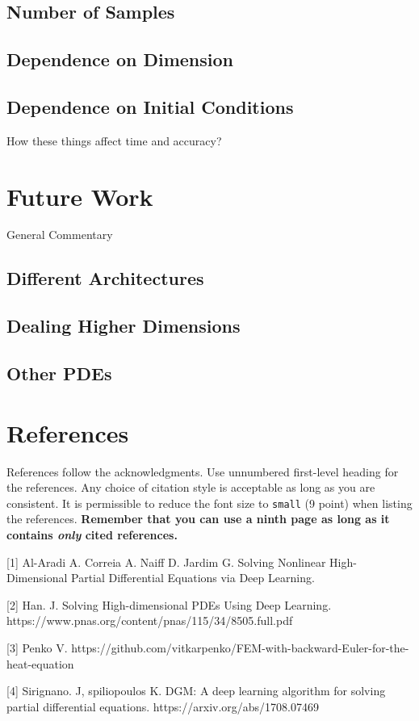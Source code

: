 \documentclass{article}
\begin{document}
\subsection{Number of Samples}

\subsection{Dependence on Dimension}

\subsection{Dependence on Initial Conditions}

How these things affect time and accuracy?

\section{Future Work}

General Commentary

\subsection{Different Architectures}

\subsection{Dealing Higher Dimensions}

\subsection{Other PDEs}

\section*{References}

References follow the acknowledgments. Use unnumbered first-level
heading for the references. Any choice of citation style is acceptable
as long as you are consistent. It is permissible to reduce the font
size to \verb+small+ (9 point) when listing the references. {\bf
  Remember that you can use a ninth page as long as it contains
  \emph{only} cited references.}
\medskip

\small

[1] Al-Aradi A. Correia A. Naiff D. Jardim G. Solving Nonlinear High-Dimensional Partial Differential Equations via Deep Learning.

[2] Han. J. Solving High-dimensional PDEs Using Deep Learning. https://www.pnas.org/content/pnas/115/34/8505.full.pdf

[3] Penko V. https://github.com/vitkarpenko/FEM-with-backward-Euler-for-the-heat-equation

[4] Sirignano. J, spiliopoulos K. DGM: A deep learning algorithm for solving partial differential equations. https://arxiv.org/abs/1708.07469
\end{document}
